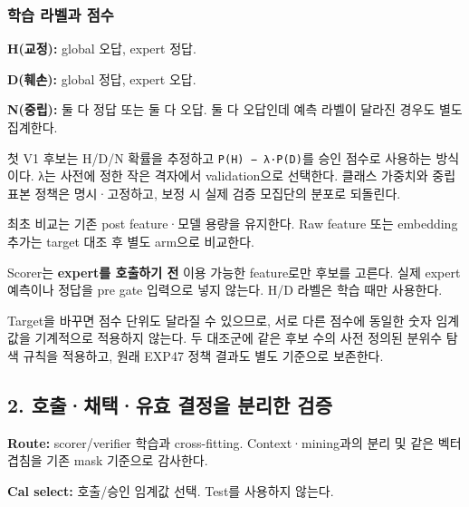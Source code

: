 \subsubsection{학습 라벨과 점수}
\par\noindent \textbullet\enspace \textbf{H(교정):} global 오답, expert 정답.


\par\noindent \textbullet\enspace \textbf{D(훼손):} global 정답, expert 오답.


\par\noindent \textbullet\enspace \textbf{N(중립):} 둘 다 정답 또는 둘 다 오답. 둘 다 오답인데 예측 라벨이 달라진 경우도 별도 집계한다.


\par\noindent \textbullet\enspace 첫 V1 후보는 H/\allowbreak{}D/\allowbreak{}N 확률을 추정하고 \texttt{P(H) − λ\allowbreak{}·P(D)}를 승인 점수로 사용하는 방식이다. λ는 사전에 정한 작은 격자에서 validation으로 선택한다. 클래스 가중치와 중립 표본 정책은 명시·고정하고, 보정 시 실제 검증 모집단의 분포로 되돌린다.


\par\noindent \textbullet\enspace 최초 비교는 기존 post feature·모델 용량을 유지한다. Raw feature 또는 embedding 추가는 target 대조 후 별도 arm으로 비교한다.


\par\noindent \textbullet\enspace Scorer는 \textbf{expert를 호출하기 전} 이용 가능한 feature로만 후보를 고른다. 실제 expert 예측이나 정답을 pre gate 입력으로 넣지 않는다. H/\allowbreak{}D 라벨은 학습 때만 사용한다.


\par\noindent \textbullet\enspace Target을 바꾸면 점수 단위도 달라질 수 있으므로, 서로 다른 점수에 동일한 숫자 임계값을 기계적으로 적용하지 않는다. 두 대조군에 같은 후보 수의 사전 정의된 분위수 탐색 규칙을 적용하고, 원래 EXP47 정책 결과도 별도 기준으로 보존한다.


\subsection{2. 호출·채택·유효 결정을 분리한 검증}
\par\noindent \textbullet\enspace \textbf{Route:} scorer/\allowbreak{}verifier 학습과 cross-fitting. Context·mining과의 분리 및 같은 벡터 겹침을 기존 mask 기준으로 감사한다.


\par\noindent \textbullet\enspace \textbf{Cal select:} 호출/\allowbreak{}승인 임계값 선택. Test를 사용하지 않는다.


